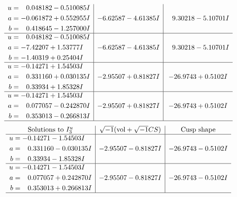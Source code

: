 \documentclass[1p]{elsarticle_modified}
\theoremstyle{definition}
\newcommand{\I}{\sqrt{-1}}
\begin{document}
$$\begin{array}{c|c|c}
\begin{aligned}
u &= \phantom{-}0.048182 - 0.510085 I \\
a &= -0.061872 + 0.552955 I \\
b &= \phantom{-}0.418645 - 1.257000 I\end{aligned}
 & -6.62587 - 4.61385 I & \phantom{-}9.30218 - 5.10701 I \\ \hline\begin{aligned}
u &= \phantom{-}0.048182 - 0.510085 I \\
a &= -7.42207 + 1.53777 I \\
b &= -1.40319 + 0.25404 I\end{aligned}
 & -6.62587 - 4.61385 I & \phantom{-}9.30218 - 5.10701 I \\ \hline\begin{aligned}
u &= -0.14271 + 1.54503 I \\
a &= \phantom{-}0.331160 + 0.030135 I \\
b &= \phantom{-}0.33934 + 1.85328 I\end{aligned}
 & -2.95507 + 0.81827 I & -26.9743 + 0.5102 I \\ \hline\begin{aligned}
u &= -0.14271 + 1.54503 I \\
a &= \phantom{-}0.077057 - 0.242870 I \\
b &= \phantom{-}0.353013 - 0.266813 I\end{aligned}
 & -2.95507 + 0.81827 I & -26.9743 + 0.5102 I\\
 \hline 
 \end{array}$$\newpage$$\begin{array}{c|c|c}  
\text{Solutions to }I^u_{3}& \I (\text{vol} + \sqrt{-1}CS) & \text{Cusp shape}\\
 \hline 
\begin{aligned}
u &= -0.14271 - 1.54503 I \\
a &= \phantom{-}0.331160 - 0.030135 I \\
b &= \phantom{-}0.33934 - 1.85328 I\end{aligned}
 & -2.95507 - 0.81827 I & -26.9743 - 0.5102 I \\ \hline\begin{aligned}
u &= -0.14271 - 1.54503 I \\
a &= \phantom{-}0.077057 + 0.242870 I \\
b &= \phantom{-}0.353013 + 0.266813 I\end{aligned}
 & -2.95507 - 0.81827 I & -26.9743 - 0.5102 I\\
 \hline 
 \end{array}$$\newpage\newpage\renewcommand{\arraystretch}{1}
\end{document}
